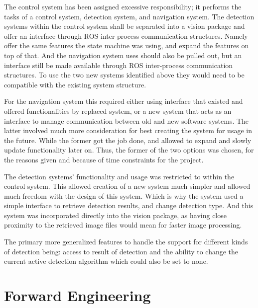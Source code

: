 The control system has been assigned excessive responsibility; it performs the tasks of a control system, detection system, and navigation system. The detection systems within the control system shall be separated into a vision package and offer an interface through ROS inter process communication structures. Namely offer the same features the state machine was using, and expand the features on top of that. And the navigation system uses should also be pulled out, but an interface still be made available through ROS inter-process communication structures. To use the two new systems identified above they would need to be compatible with the existing system structure.

For the navigation system this required either using interface that existed and offered functionalities by replaced system, or a new system that acts as an interface to manage communication between old and new software systems. The latter involved much more consideration for best creating the system for usage in the future. While the former got the job done, and allowed to expand and slowly update functionality later on. Thus, the former of the two options was chosen, for the reasons given and because of time constraints for the project.

The detection systems' functionality and usage was restricted to within the control system. This allowed creation of a new system much simpler and allowed much freedom with the design of this system. Which is why the system used a simple interface to retrieve detection results, and change detection type. And this system was incorporated directly into the vision package, as having close proximity to the retrieved image files would mean for faster image processing.

The primary more generalized features to handle the support for different kinds of detection being: access to result of detection and the ability to change the current active detection algorithm which could also be set to none.

\section{Forward Engineering}